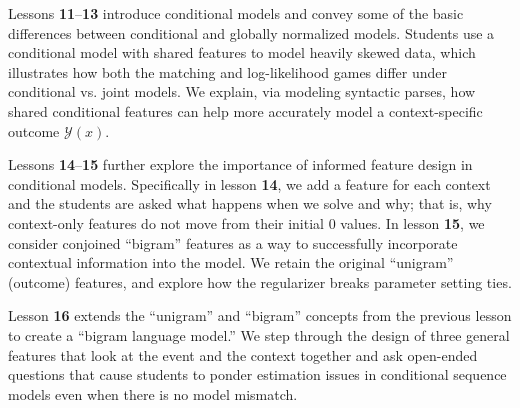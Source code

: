 \documentclass[11pt,letterpaper]{article}
\begin{document}
Lessons \textbf{11}--\textbf{13} introduce conditional models and convey some of the basic differences between 
conditional and globally normalized models. Students use a conditional model with shared features to model 
heavily skewed data, which illustrates how both the matching and log-likelihood games differ under conditional vs. 
joint models. We explain, via modeling syntactic parses, how shared conditional features can help more accurately 
model a context-specific outcome $\mathcal{Y}(x)$.

Lessons \textbf{14}--\textbf{15} further explore the importance of informed feature design in conditional models. 
Specifically in lesson \textbf{14}, we add a feature for each context and the students are asked what happens 
when we solve and why; that is, why context-only features do not move from their initial 0 values. 
In lesson \textbf{15}, we consider conjoined ``bigram'' features as a way to successfully incorporate 
contextual information into the model. We retain the original ``unigram'' (outcome) features, and explore
how the regularizer breaks parameter setting ties.

Lesson \textbf{16} extends the ``unigram'' and ``bigram'' concepts from the previous lesson to create a ``bigram 
language model.'' We step through the design of three general features that look at the event and the context 
together and ask open-ended questions that cause students to ponder estimation issues in conditional sequence 
models even when there is no model mismatch.

\end{document}
